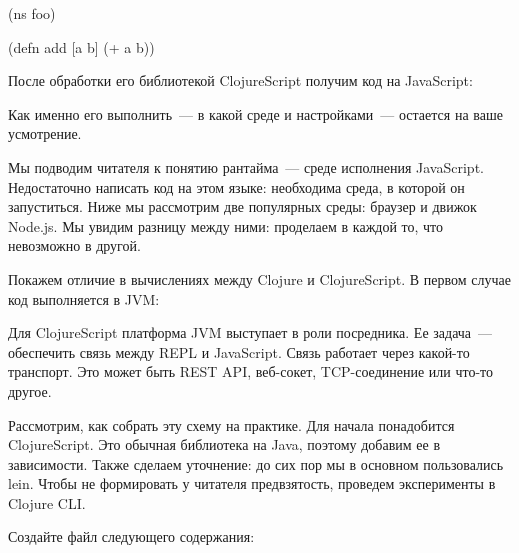 \begin{english}
  \begin{clojure}
(ns foo)

(defn add [a b]
  (+ a b))
  \end{clojure}
\end{english}

После обработки его библиотекой ClojureScript получим код на JavaScript:

\begin{english}
\end{english}

Как именно его выполнить~--- в какой среде и настройками~--- остается на ваше усмотрение.

Мы подводим читателя к понятию рантайма~--- среде исполнения JavaScript. Недостаточно написать код на этом языке: необходима среда, в которой он запуститься. Ниже мы рассмотрим две популярных среды: браузер и движок Node.js. Мы увидим разницу между ними: проделаем в каждой то, что невозможно в другой.

Покажем отличие в вычислениях между Clojure и ClojureScript. В первом случае код выполняется в JVM:

\begin{figure}[H]
  \centering
  
  \label{fig:chart-repl-03}
\end{figure}

Для ClojureScript платформа JVM выступает в роли посредника. Ее задача~--- обеспечить связь между REPL и JavaScript. Связь работает через какой-то транспорт. Это может быть REST API, веб-сокет, TCP-соединение или что-то другое.

\begin{figure}[H]
  \centering
  
  \label{fig:chart-repl-04}
\end{figure}

Рассмотрим, как собрать эту схему на практике. Для начала понадобится ClojureScript. Это обычная библиотека на Java, поэтому добавим ее в зависимости. Также сделаем уточнение: до сих пор мы в основном пользовались lein. Чтобы не формировать у читателя предвзятость, проведем эксперименты в Clojure CLI.

Создайте файл  следующего содержания:

